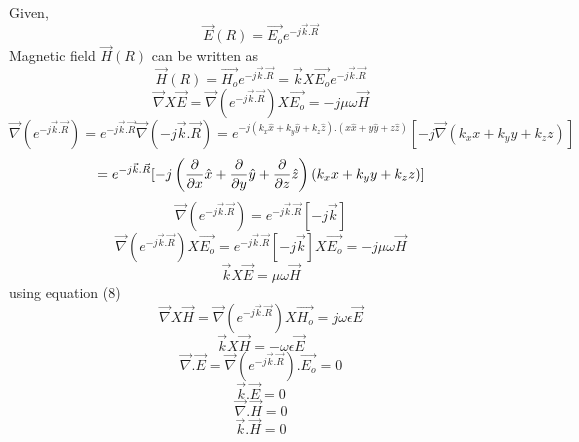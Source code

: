 \documentclass[a4paper]{article}
\begin{document}
    \begin{answer}[Question 4]
        Given,
        \[
            \vec{E}(R) = \vec{E_{o}} e^{-j \vec{k}.\vec{R}}
        \]
        Magnetic field \(\vec{H}(R)\) can be written as
        \[
            \vec{H}(R) = \vec{H_{o}} e^{-j \vec{k}.\vec{R}} = \vec{k}X\vec{E_{o} }e^{-j \vec{k}.\vec{R}}
        \]
    \begin{equation}
            \boxed{\vec{\nabla}X\vec{E} = \vec{\nabla}(e^{-j \vec{k}.\vec{R}})X\vec{E_{o}} = -j \mu \omega \vec{H}}
    \end{equation}
        \[
            \vec{\nabla}(e^{-j \vec{k}.\vec{R}}) = e^{-j \vec{k}.\vec{R}} \vec{\nabla}(-j \vec{k}.\vec{R}) = e^{-j (k_{x} \hat{x}  + k_{y} \hat{y}  + k_{z} \hat{z} ).(x \hat{x} + y \hat{y} + z \hat{z} )}[-j \vec{\nabla}(k_{x} x + k_{y} y + k_{z} z)]
        \]
        \[
            =  e^{-j \vec{k}.\vec{R}}[-j \left(\pdv{}{x}\hat{x} + \pdv{}{y} \hat{y} + \pdv{}{z} \hat{z} \right)(k_{x} x + k_{y} y + k_{z} z)] 
        \]
        \begin{equation}
            \boxed{\vec{\nabla}(e^{-j \vec{k}.\vec{R}}) = e^{-j \vec{k}.\vec{R}}[-j \vec{k}] }
        \end{equation}
        \[
            \vec{\nabla}(e^{-j \vec{k}.\vec{R}})X\vec{E_o}  = e^{-j \vec{k}.\vec{R}}[-j \vec{k}]X\vec{E_o} = -j \mu\omega\vec{H} 
        \]
        \[
            \boxed{\vec{k}X\vec{E} = \mu\omega \vec{H}}
        \]
        using equation (8)
        \[
            \vec{\nabla}X\vec{H} = \vec{\nabla}(e^{-j \vec{k}.\vec{R}})X\vec{H_o} = j \omega \epsilon \vec{E}
        \]
        \[
            \boxed{\vec{k}X\vec{H} = -\omega \epsilon \vec{E} }
        \]
        \[
            \vec{\nabla}.\vec{E} = \vec{\nabla}(e^{-j \vec{k}.\vec{R}}).\vec{E_o} = 0
        \]
        \[
            \boxed{\vec{k}.\vec{E} = 0}
        \]
        \[
            \vec{\nabla}.\vec{H} = 0
        \]
        \[
            \boxed{\vec{k}.\vec{H} = 0}
        \]
    \end{answer}
\end{document}
